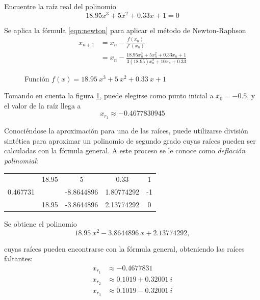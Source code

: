 \begin{ex}
    Encuentre la raíz real del polinomio 
    \[
        18.95x^3 + 5x^2  + 0.33x + 1 = 0
    \]

    \begin{solution}
        Se aplica la fórmula \ref{eqn:newton} para aplicar el método de
        Newton-Raphson
        \begin{align*}
            x_{n+1} &= x_n - \frac{f(x_n)}{f'(x_n)} \\
                &= x_n - \frac{18.95x_n^3 + 5x_n^2 + 0.33x_n +
                1}{3(18.95)x_n^2 + 10x_n + 0.33}
        \end{align*}

        \begin{figure}
            \centering
            \caption{Función $f(x) = 18.95\ x^3 + 5\ x^2 + 0.33\ x + 1$}
            \label{fig:ejercicio-newton-2}
        \end{figure}

        Tomando en cuenta la figura \ref{fig:ejercicio-newton-2}, puede
        elegirse como punto inicial a \(x_0 = -0.5 \), y el valor de la raíz
        llega a
        \[
            \boxed{x_{r_1} \approx -0.4677830945}
        \]

        Conociéndose la aproximación para una de las raíces, puede utilizarse
        división sintética para aproximar un polinomio de segundo grado cuyas
        raíces pueden ser calculadas con la fórmula general. A este proceso se
        le conoce como \textit{deflación polinomial}:

        \begin{center}
            \begin{tabular}{ c | c c c c }
                & 18.95 & 5 & 0.33 & 1 \\
                    0.467731 & & -8.8644896 & 1.80774292 & -1 \\
             \hline
                 & 18.95 & -3.8644896 & 2.13774292 & 0
            \end{tabular}
        \end{center}

        Se obtiene el polinomio
        \[
            18.95\ x^2 - 3.8644896\ x + 2.13774292,
        \]

        \noindent cuyas raíces pueden encontrarse con la fórmula general,
        obteniendo las raíces faltantes:
        \begin{align*}
            x_{r_1} & \approx -0.4677831 \\
            x_{r_2} & \approx 0.1019 + 0.32001\ i \\
            x_{r_3} & \approx 0.1019 - 0.32001\ i 
        \end{align*}
    \end{solution}
\end{ex}

